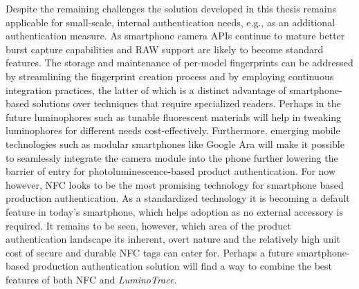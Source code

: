 \documentclass[thesis.tex]{subfiles}
\begin{document}
Despite the remaining challenges the solution developed in this thesis remains applicable for small-scale, internal authentication needs, e.g., as an additional authentication measure. As smartphone camera APIs continue to mature better burst capture capabilities and RAW support are likely to become standard features. The storage and maintenance of per-model fingerprints can be addressed by streamlining the fingerprint creation process and by employing continuous integration practices, the latter of which is a distinct advantage of smartphone-based solutions over techniques that require specialized readers. Perhaps in the future luminophores such as tunable fluorescent materials will help in tweaking luminophores for different needs cost-effectively. Furthermore, emerging mobile technologies such as modular smartphones like Google Ara will make it possible to seamlessly integrate the camera module into the phone further lowering the barrier of entry for photoluminescence-based product authentication. For now however, NFC looks to be the most promising technology for smartphone based production authentication. As a standardized technology it is becoming a default feature in today's smartphone, which helps adoption as no external accessory is required. It remains to be seen, however, which area of the product authentication landscape its inherent, overt nature and the relatively high unit cost of secure and durable NFC tags can cater for. Perhaps a future smartphone-based production authentication solution will find a way to combine the best features of both NFC and \emph{LuminoTrace}.
\end{document}
